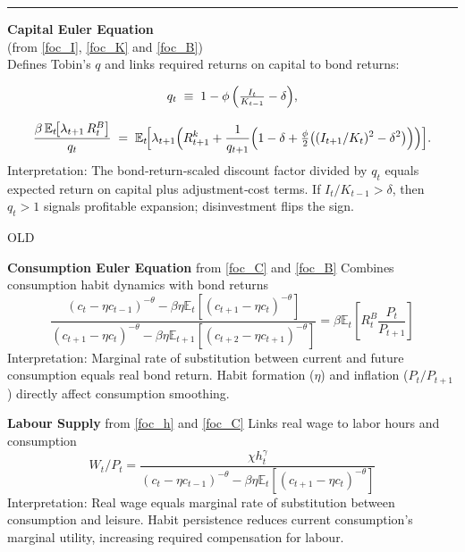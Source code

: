\documentclass[11pt,preprint]{elsarticle}
\numberwithin{equation}{section}
\numberwithin{figure}{section}
\numberwithin{table}{section}
\begin{document}
\begin{center}\rule{0.5\linewidth}{0.5pt}\end{center}

\textbf{Capital Euler Equation}\\
(from \eqref{foc_I}, \eqref{foc_K} and \eqref{foc_B})\\
Defines Tobin's \(q\) and links required returns on capital to bond
returns:

\[
  q_t \;\equiv\; 1 - \phi\,\Bigl(\tfrac{I_t}{K_{t-1}} - \delta\Bigr),
\]

\[
  \frac{\beta\,\mathbb{E}_t\!\bigl[\lambda_{t+1}\,R_t^B\bigr]}{q_t}
  \;=\;
  \mathbb{E}_t\!\Bigl[
    \lambda_{t+1}\Bigl(
      R_{t+1}^k
      + \frac{1}{q_{t+1}}
        \Bigl(
          1 - \delta
          + \tfrac{\phi}{2}\bigl((I_{t+1}/K_t)^2 - \delta^2\bigr)
        \Bigr)
    \Bigr)
  \Bigr].
\] Interpretation: The bond‐return‐scaled discount factor divided by
\(q_t\) equals expected return on capital plus adjustment‐cost terms. If
\(I_t/K_{t-1}>\delta\), then \(q_t>1\) signals profitable expansion;
disinvestment flips the sign.

OLD

\newpage

\textbf{Consumption Euler Equation} from \ref{foc_C} and \ref{foc_B}
Combines consumption habit dynamics with bond returns
\begin{equation}\label{reduced_C}
\frac{(c_t - \eta c_{t-1})^{-\theta} - \beta\eta \mathbb{E}_t[(c_{t+1} - \eta c_t)^{-\theta}]}
     {(c_{t+1} - \eta c_t)^{-\theta} - \beta\eta \mathbb{E}_{t+1}[(c_{t+2} - \eta c_{t+1})^{-\theta}]}
= \beta \mathbb{E}_t \left[ R^B_t \frac{P_t}{P_{t+1}} \right]
\end{equation} Interpretation: Marginal rate of substitution between
current and future consumption equals real bond return. Habit formation
(\(\eta\)) and inflation (\(P_t/P_{t+1}\)) directly affect consumption
smoothing.

\textbf{Labour Supply} from \ref{foc_h} and \ref{foc_C} Links real wage
to labor hours and consumption \begin{equation}\label{reduced_h}
W_t / P_t = \frac{\chi h_t^{\gamma}}
                   {(c_t - \eta c_{t-1})^{-\theta} - \beta\eta \mathbb{E}_t[(c_{t+1} - \eta c_t)^{-\theta}]}
\end{equation} Interpretation: Real wage equals marginal rate of
substitution between consumption and leisure. Habit persistence reduces
current consumption's marginal utility, increasing required compensation
for labour.
\end{document}
